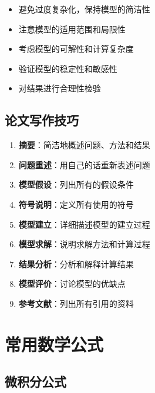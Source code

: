 \begin{warningbox}[title=模型建立的注意事项]
\begin{itemize}
    \item 避免过度复杂化，保持模型的简洁性
    \item 注意模型的适用范围和局限性
    \item 考虑模型的可解性和计算复杂度
    \item 验证模型的稳定性和敏感性
    \item 对结果进行合理性检验
\end{itemize}
\end{warningbox}

\subsection{论文写作技巧}

\begin{infobox}[title=数学建模论文结构]
\begin{enumerate}
    \item \textbf{摘要}：简洁地概述问题、方法和结果
    \item \textbf{问题重述}：用自己的话重新表述问题
    \item \textbf{模型假设}：列出所有的假设条件
    \item \textbf{符号说明}：定义所有使用的符号
    \item \textbf{模型建立}：详细描述模型的建立过程
    \item \textbf{模型求解}：说明求解方法和计算过程
    \item \textbf{结果分析}：分析和解释计算结果
    \item \textbf{模型评价}：讨论模型的优缺点
    \item \textbf{参考文献}：列出所有引用的资料
\end{enumerate}
\end{infobox}

\section{常用数学公式}\label{app:mathematical-formulas}

\subsection{微积分公式}

